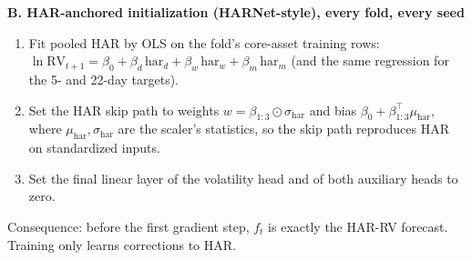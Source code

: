 \documentclass[10pt]{article}
\begin{document}
\begin{minipage}[t]{0.53\linewidth}
\vspace{5mm}
{\bfseries\color{accent} B. HAR-anchored initialization (HARNet-style), every fold, every seed}\\[1mm]
{\small
\begin{enumerate}\itemsep1pt
\item Fit pooled HAR by OLS on the fold's core-asset training rows:
$\ln\mathrm{RV}_{t+1}=\beta_0+\beta_d\,\mathrm{har}_d+\beta_w\,\mathrm{har}_w+\beta_m\,\mathrm{har}_m$
(and the same regression for the 5- and 22-day targets).
\item Set the HAR skip path to weights $w=\beta_{1:3}\odot\sigma_{\mathrm{har}}$ and bias
$\beta_0+\beta_{1:3}^{\top}\mu_{\mathrm{har}}$, where $\mu_{\mathrm{har}},\sigma_{\mathrm{har}}$ are the scaler's statistics, so the
skip path reproduces HAR on standardized inputs.
\item Set the final linear layer of the volatility head and of both auxiliary heads to zero.
\end{enumerate}
Consequence: before the first gradient step, $f_t$ is exactly the HAR-RV forecast. Training only learns corrections to HAR.}
\end{minipage}\hfill
\end{document}
